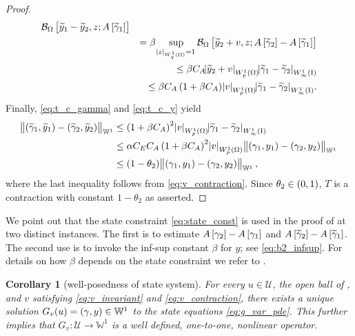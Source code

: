 \documentclass[final]{siamltex}
\newtheorem{cor}[theorem]{Corollary}
\begin{document}
\begin{proof}
\begin{eqnarray}
					{{\mathcal{B}}_\Omega}\sbr{{\widetilde{y}}_1 - {\widetilde{y}}_2,z;A\sbr{{\widetilde{\gamma}}_1}} \nonumber \\
				&&= \beta\sup_{{\abs{{z}}_{{W^{{{1}}}_{{{q}}}\del{{{\Omega}}}}}}=1} 
					{{\mathcal{B}}_\Omega}\sbr{{\widetilde{y}}_2+v,z;A\sbr{{\widetilde{\gamma}}_2}-A\sbr{{\widetilde{\gamma}}_1}} \\
				&&\leq \beta C_A{\abs{{{\widetilde{y}}_2+v}}_{{W^{{1}}_{{p}}\del{{\Omega}}}}} {\abs{{{\widetilde{\gamma}}_1 - {\widetilde{\gamma}}_2}}_{{W^{{{1}}}_{{{\infty}}}\del{{\text{\rm I}}}}}}
					\nonumber \\ 
				&&\leq \beta C_A\del{1+\beta C_A }{\abs{{v}}_{{W^{{1}}_{{p}}\del{{\Omega}}}}}{\abs{{{\widetilde{\gamma}}_1 - {\widetilde{\gamma}}_2}}_{{W^{{{1}}}_{{{\infty}}}\del{{\text{\rm I}}}}}}. 
					\nonumber
          \end{eqnarray}
          Finally, \eqref{eq:t_c_gamma} and \eqref{eq:t_c_y} yield
          \begin{align*}
          	\norm{\del{{\widetilde{\gamma}}_1, {\widetilde{y}}_1} - \del{{\widetilde{\gamma}}_2,{\widetilde{y}}_2}}_{{\mathbb{W}}^1}
             		&\leq \del{1+\beta C_A}^2{\abs{{v}}_{{W^{{1}}_{{p}}\del{{\Omega}}}}}{\abs{{{\widetilde{\gamma}}_1 - {\widetilde{\gamma}}_2}}_{{W^{{1}}_{{\infty}}\del{{\text{\rm I}}}}}} \\
			&\leq \alpha C_E C_A\del{1+\beta C_A}^2{\abs{{v}}_{{W^{{1}}_{{p}}\del{{\Omega}}}}}\norm{\del{\gamma_1, y_1}-\del{\gamma_2,y_2}}_{{\mathbb{W}}^1} \\
			&\leq \del{1-\theta_2} \norm{\del{\gamma_1, y_1}-\del{\gamma_2,y_2}}_{{\mathbb{W}}^1},
          \end{align*}
          where the last inequality follows from \eqref{eq:v_contraction}. Since $\theta_2 \in \intoo{0,1}$, $T$ is a contraction with constant $1-\theta_2$ as asserted.
\end{proof}

We point out that the state constraint \eqref{eq:state_const} is used in the 
proof of  at two distinct instances. The first is to 
estimate $A\sbr{\gamma_2}-A\sbr{\gamma_1}$ and $A\sbr{{\widetilde{\gamma}}_2}-A\sbr{{\widetilde{\gamma}}_1}$. 
The second use
is to invoke the inf-sup constant $\beta$ for $y$; see \eqref{eq:b2_infsup}.
For details on how $\beta$ depends on the state constraint we refer to \cite[Proposition 2.3]{PSaavedra_RScott_1991}.

\begin{cor}[well-posedness of state system] \label{cor:g_operator} 
For every $u\in {\mathcal{U}}$, the open ball of , and $v$ satisfying \eqref{eq:v_invariant} and \eqref{eq:v_contraction}, there exists a unique solution 
$G_v(u) = \del{\gamma,y} \in {\mathbb{W}}^1$ to the state equations \eqref{eq:g_var_pde}. This further implies that 
$G_v:{\mathcal{U}}\to{\mathbb{W}}^1$ is a well defined, one-to-one, nonlinear operator. 
\end{cor}
\end{document}
